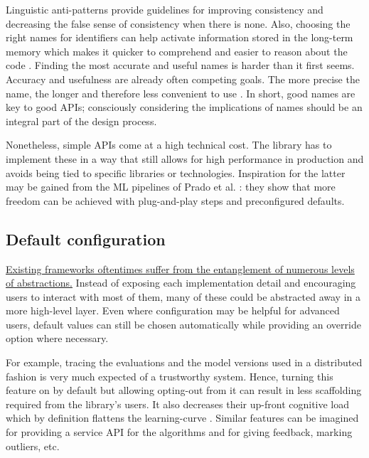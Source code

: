 Linguistic anti-patterns provide guidelines for improving consistency and decreasing the false sense of consistency when there is none. Also, choosing the right names for identifiers can help activate information stored in the long-term memory which makes it quicker to comprehend and easier to reason about the code \cite{deissenboeck2006concise}. Finding the most accurate and useful names is harder than it first seems. Accuracy and usefulness are already often competing goals. The more precise the name, the longer and therefore less convenient to use \cite{butler2009relating}. In short, good names are key to good APIs; consciously considering the implications of names should be an integral part of the design process.

Nonetheless, simple APIs come at a high technical cost. The library has to implement these in a way that still allows for high performance in production \cite{kleppmann2017designing} and avoids being tied to specific libraries or technologies. Inspiration for the latter may be gained from the ML pipelines of Prado et al. \cite{prado2020bonseyes}: they show that more freedom can be achieved with plug-and-play steps and preconfigured defaults. 

\subsection{Default configuration}

\href{https://grugbrain.dev/#grug-on-apis}{Existing frameworks oftentimes suffer from the entanglement of numerous levels of abstractions.} Instead of exposing each implementation detail and encouraging users to interact with most of them, many of these could be abstracted away in a more high-level layer. Even where configuration may be helpful for advanced users, default values can still be chosen automatically while providing an override option where necessary.

For example, tracing the evaluations and the model versions used in a distributed fashion is very much expected of a trustworthy system. Hence, turning this feature on by default but allowing opting-out from it can result in less scaffolding required from the library's users. It also decreases their up-front cognitive load which by definition flattens the learning-curve \cite{hermans2021programmer}. Similar features can be imagined for providing a service API for the algorithms and for giving feedback, marking outliers, etc.

